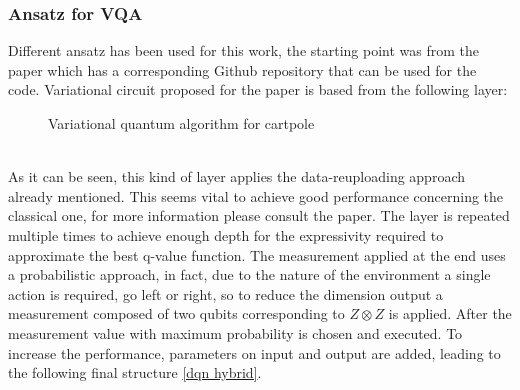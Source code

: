 \subsubsection{Ansatz for VQA}
Different ansatz has been used for this work, the starting point was from the paper \cite{Scholik_2022} which has a corresponding Github repository that can be used for the code.
Variational circuit proposed for the paper is based from the following layer:
\begin{figure}[!h]
	\centering
	\caption{Variational quantum algorithm for cartpole }
	\label{vqa dqn}
\end{figure}\\
As it can be seen, this kind of layer applies the data-reuploading approach already mentioned. This seems vital to achieve good performance concerning the classical one, for more information please consult the paper. The layer is repeated multiple times to achieve enough depth for the expressivity required to approximate the best q-value function. The measurement applied at the end uses a probabilistic approach, in fact, due to the nature of the environment a single action is required, go left or right, so to reduce the dimension output a measurement composed of two qubits corresponding to $Z \otimes Z$ is applied. After the measurement value with maximum probability is chosen and executed. To increase the performance, parameters on input and output are added, leading to the following final structure \ref{dqn hybrid}.\\

